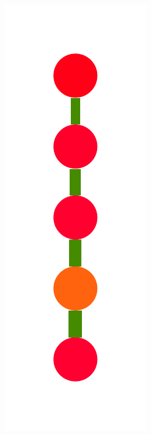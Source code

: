 \documentclass[a4paper,10pt]{article}
\begin{document}
\begin{figure}
{%
    \includegraphics[scale=.14]{../figures/vector/6-3-recursion-induced-1.pdf}
}
\end{figure}
\end{document}
